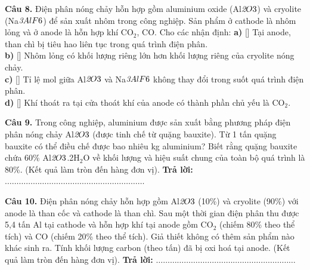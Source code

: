 \documentclass{article}
\begin{document}
\fontsize{22}{29}\selectfont
\textbf{Câu 8.} Điện phân nóng chảy hỗn hợp gồm aluminium oxide (Al$\textit{{\text{2}}$O$}{\text{3}}$) và cryolite (Na$\textit{{\text{3}}$AlF$}{\text{6}}$) để sản xuất nhôm trong công nghiệp. Sản phẩm ở cathode là nhôm lỏng và ở anode là hỗn hợp khí CO$_{\text{2}}$, CO. Cho các nhận định:
\vspace{6pt}
\textbf{a)} [\quad] Tại anode, than chì bị tiêu hao liên tục trong quá trình điện phân.\\[4pt]
\textbf{b)} [\quad] Nhôm lỏng có khối lượng riêng lớn hơn khối lượng riêng của cryolite nóng chảy.\\[4pt]
\textbf{c)} [\quad] Tỉ lệ mol giữa Al$\textit{{\text{2}}$O$}{\text{3}}$ và Na$\textit{{\text{3}}$AlF$}{\text{6}}$ không thay đổi trong suốt quá trình điện phân.\\[4pt]
\textbf{d)} [\quad] Khí thoát ra tại cửa thoát khí của anode có thành phần chủ yếu là CO$_{\text{2}}$.\\[4pt]
\vspace*{\fill}
\newpage

\fontsize{24}{32}\selectfont
\textbf{Câu 9.} Trong công nghiệp, aluminium được sản xuất bằng phương pháp điện phân nóng chảy Al$\textit{{\text{2}}$O$}{\text{3}}$ (được tinh chế từ quặng bauxite). Từ 1 tấn quặng bauxite có thể điều chế được bao nhiêu kg aluminium? Biết rằng quặng bauxite chứa 60\% Al$\textit{{\text{2}}$O$}{\text{3}}$.2H$_{\text{2}}$O về khối lượng và hiệu suất chung của toàn bộ quá trình là 80\%. (Kết quả làm tròn đến hàng đơn vị).
\vspace{12pt}
\textbf{Trả lời:} $\dots\dots\dots\dots\dots\dots\dots\dots\dots\dots\dots\dots\dots\dots\dots\dots\dots\dots\dots\dots$
\vspace*{\fill}
\newpage

\fontsize{24}{32}\selectfont
\textbf{Câu 10.} Điện phân nóng chảy hỗn hợp gồm Al$\textit{{\text{2}}$O$}{\text{3}}$ (10\%) và cryolite (90\%) với anode là than cốc và cathode là than chì. Sau một thời gian điện phân thu được 5,4 tấn Al tại cathode và hỗn hợp khí tại anode gồm CO$_{\text{2}}$ (chiếm 80\% theo thể tích) và CO (chiếm 20\% theo thể tích). Giả thiết không có thêm sản phẩm nào khác sinh ra. Tính khối lượng carbon (theo tấn) đã bị oxi hoá tại anode. (Kết quả làm tròn đến hàng đơn vị).
\vspace{12pt}
\textbf{Trả lời:} $\dots\dots\dots\dots\dots\dots\dots\dots\dots\dots\dots\dots\dots\dots\dots\dots\dots\dots\dots\dots$
\vspace*{\fill}
\newpage
\end{document}
